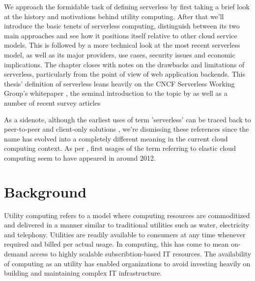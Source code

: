 \documentclass[utf8,english]{gradu3}
\begin{document}
We approach the formidable task of defining serverless by first taking a brief look at the history and motivations behind utility computing. After that we'll introduce the basic tenets of serverless computing, distinguish between its two main approaches and see how it positions itself relative to other cloud service models. This is followed by a more technical look at the most recent serverless model, as well as its major providers, use cases, security issues and economic implications. The chapter closes with notes on the drawbacks and limitations of serverless, particularly from the point of view of web application backends. This thesis' definition of serverless leans heavily on the CNCF Serverless Working Group's whitepaper \parencite{cncf18serverlessWG}, the seminal introduction to the topic by \textcite{robert2016serverlessarchitectures} as well as a number of recent survey articles \parencite[e.g.][]{baldini17currentTrends,van2017spec,fox17}

As a sidenote, although the earliest uses of term 'serverless' can be traced back to peer-to-peer and client-only solutions \parencite{fox17}, we're dismissing these references since the name has evolved into a completely different meaning in the current cloud computing context. As per \textcite{robert2016serverlessarchitectures}, first usages of the term referring to elastic cloud computing seem to have appeared in around 2012.


\section{Background} \label{sec:background}

Utility computing refers to a model where computing resources are commoditized and delivered in a manner similar to traditional utilities such as water, electricity and telephony. Utilities are readily available to consumers at any time whenever required and billed per actual usage. In computing, this has come to mean on-demand access to highly scalable subscribtion-based IT resources. The availability of computing as an utility has enabled organizations to avoid investing heavily on building and maintaining complex IT infrastructure. \parencite{buyya09cloud}
\end{document}
